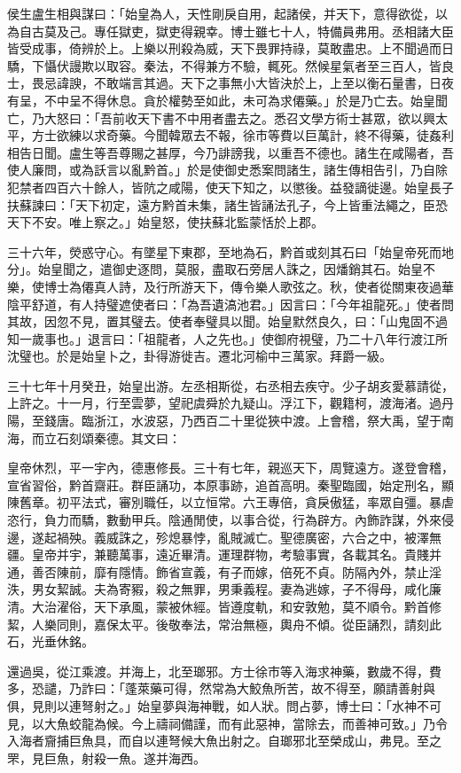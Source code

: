 \begin{pinyinscope}
侯生盧生相與謀曰：「始皇為人，天性剛戾自用，起諸侯，并天下，意得欲從，以為自古莫及己。專任獄吏，獄吏得親幸。博士雖七十人，特備員弗用。丞相諸大臣皆受成事，倚辨於上。上樂以刑殺為威，天下畏罪持祿，莫敢盡忠。上不聞過而日驕，下懾伏謾欺以取容。秦法，不得兼方不驗，輒死。然候星氣者至三百人，皆良士，畏忌諱諛，不敢端言其過。天下之事無小大皆決於上，上至以衡石量書，日夜有呈，不中呈不得休息。貪於權勢至如此，未可為求僊藥。」於是乃亡去。始皇聞亡，乃大怒曰：「吾前收天下書不中用者盡去之。悉召文學方術士甚眾，欲以興太平，方士欲練以求奇藥。今聞韓眾去不報，徐市等費以巨萬計，終不得藥，徒姦利相告日聞。盧生等吾尊賜之甚厚，今乃誹謗我，以重吾不德也。諸生在咸陽者，吾使人廉問，或為訞言以亂黔首。」於是使御史悉案問諸生，諸生傳相告引，乃自除犯禁者四百六十餘人，皆阬之咸陽，使天下知之，以懲後。益發謫徙邊。始皇長子扶蘇諫曰：「天下初定，遠方黔首未集，諸生皆誦法孔子，今上皆重法繩之，臣恐天下不安。唯上察之。」始皇怒，使扶蘇北監蒙恬於上郡。

三十六年，熒惑守心。有墜星下東郡，至地為石，黔首或刻其石曰「始皇帝死而地分」。始皇聞之，遣御史逐問，莫服，盡取石旁居人誅之，因燔銷其石。始皇不樂，使博士為僊真人詩，及行所游天下，傳令樂人歌弦之。秋，使者從關東夜過華陰平舒道，有人持璧遮使者曰：「為吾遺滈池君。」因言曰：「今年祖龍死。」使者問其故，因忽不見，置其璧去。使者奉璧具以聞。始皇默然良久，曰：「山鬼固不過知一歲事也。」退言曰：「祖龍者，人之先也。」使御府視璧，乃二十八年行渡江所沈璧也。於是始皇卜之，卦得游徙吉。遷北河榆中三萬家。拜爵一級。

三十七年十月癸丑，始皇出游。左丞相斯從，右丞相去疾守。少子胡亥愛慕請從，上許之。十一月，行至雲夢，望祀虞舜於九疑山。浮江下，觀籍柯，渡海渚。過丹陽，至錢唐。臨浙江，水波惡，乃西百二十里從狹中渡。上會稽，祭大禹，望于南海，而立石刻頌秦德。其文曰：

皇帝休烈，平一宇內，德惠修長。三十有七年，親巡天下，周覽遠方。遂登會稽，宣省習俗，黔首齋莊。群臣誦功，本原事跡，追首高明。秦聖臨國，始定刑名，顯陳舊章。初平法式，審別職任，以立恒常。六王專倍，貪戾傲猛，率眾自彊。暴虐恣行，負力而驕，數動甲兵。陰通閒使，以事合從，行為辟方。內飾詐謀，外來侵邊，遂起禍殃。義威誅之，殄熄暴悖，亂賊滅亡。聖德廣密，六合之中，被澤無疆。皇帝并宇，兼聽萬事，遠近畢清。運理群物，考驗事實，各載其名。貴賤并通，善否陳前，靡有隱情。飾省宣義，有子而嫁，倍死不貞。防隔內外，禁止淫泆，男女絜誠。夫為寄豭，殺之無罪，男秉義程。妻為逃嫁，子不得母，咸化廉清。大治濯俗，天下承風，蒙被休經。皆遵度軌，和安敦勉，莫不順令。黔首修絜，人樂同則，嘉保太平。後敬奉法，常治無極，輿舟不傾。從臣誦烈，請刻此石，光垂休銘。

還過吳，從江乘渡。并海上，北至瑯邪。方士徐市等入海求神藥，數歲不得，費多，恐譴，乃詐曰：「蓬萊藥可得，然常為大鮫魚所苦，故不得至，願請善射與俱，見則以連弩射之。」始皇夢與海神戰，如人狀。問占夢，博士曰：「水神不可見，以大魚蛟龍為候。今上禱祠備謹，而有此惡神，當除去，而善神可致。」乃令入海者齎捕巨魚具，而自以連弩候大魚出射之。自瑯邪北至榮成山，弗見。至之罘，見巨魚，射殺一魚。遂并海西。


\end{pinyinscope}
